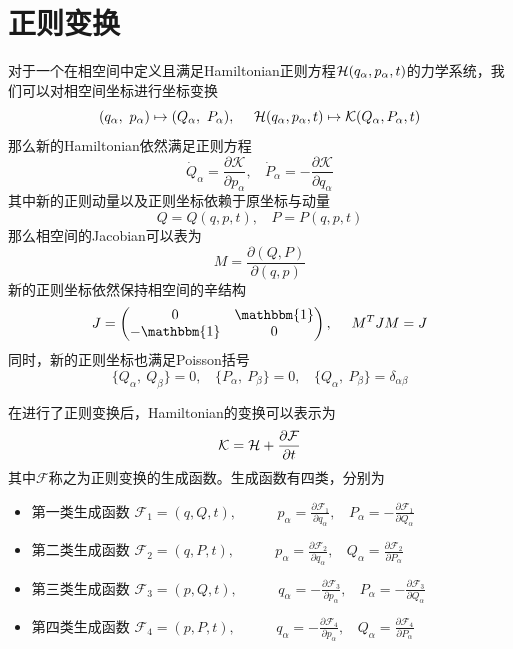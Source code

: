 \section{正则变换}
\label{sec:cannoical_transf}
对于一个在相空间中定义且满足Hamiltonian正则方程$\mathcal{H}(q_\alpha,p_\alpha,t)$的力学系统，我们可以对相空间坐标进行坐标变换
\begin{equation}
    (q_\alpha,~p_\alpha)\mapsto (Q_\alpha,~P_\alpha),~~~~\mathcal{H}(q_\alpha,p_\alpha,t)\mapsto \mathcal{K}(Q_\alpha,P_\alpha,t)
\end{equation}
那么新的Hamiltonian依然满足正则方程
\begin{equation}
    \dot Q_\alpha = \frac{\partial \mathcal{K}}{\partial p_\alpha},~~~~\dot P_\alpha = -\frac{\partial\mathcal{K}}{\partial q_\alpha}
\end{equation}
其中新的正则动量以及正则坐标依赖于原坐标与动量
\begin{equation}
    Q = Q(q,p,t),~~~~P=P(q,p,t)
\end{equation}
那么相空间的Jacobian可以表为
\begin{equation}
    M = \frac{\partial(Q,P)}{\partial(q,p)}
\end{equation}
新的正则坐标依然保持相空间的辛结构
\begin{equation}
    J = \begin{pmatrix}
        0&  \mathbbm{1}\\
        -\mathbbm{1}& 0
    \end{pmatrix},~~~~M^T J M = J
\end{equation}
同时，新的正则坐标也满足Poisson括号
\begin{equation}
    \{Q_\alpha,~Q_\beta\} = 0, ~~~~\{P_\alpha,~P_\beta\} = 0, ~~~~\{Q_\alpha,~P_\beta\} = \delta_{\alpha\beta}
\end{equation}

在进行了正则变换后，Hamiltonian的变换可以表示为
\begin{equation}
    \mathcal{K} = \mathcal{H} + \frac{\partial\mathcal{F}}{\partial t}
\end{equation}
其中$\mathcal{F}$称之为正则变换的生成函数。生成函数有四类，分别为
\begin{itemize}
    \item {第一类生成函数} $\displaystyle \mathcal{F}_1=(q,Q,t),\qquad ~~~~ p_\alpha = \frac{\partial\mathcal{F}_1}{\partial q_\alpha},~~~~P_\alpha = -\frac{\partial\mathcal{F}_1}{\partial Q_\alpha}$
    \item {第二类生成函数} $\displaystyle \mathcal{F}_2=(q,P,t),\qquad ~~~~ p_\alpha = \frac{\partial\mathcal{F}_2}{\partial q_\alpha},~~~~Q_\alpha = \frac{\partial\mathcal{F}_2}{\partial P_\alpha}$
    \item {第三类生成函数} $\displaystyle \mathcal{F}_3=(p,Q,t),\qquad ~~~~ q_\alpha = -\frac{\partial\mathcal{F}_3}{\partial p_\alpha},~~~~P_\alpha =- \frac{\partial\mathcal{F}_3}{\partial Q_\alpha}$
    \item {第四类生成函数} $\displaystyle \mathcal{F}_4=(p,P,t),\qquad ~~~~ q_\alpha = -\frac{\partial\mathcal{F}_4}{\partial p_\alpha},~~~~Q_\alpha = \frac{\partial\mathcal{F}_4}{\partial P_\alpha}$
\end{itemize}

